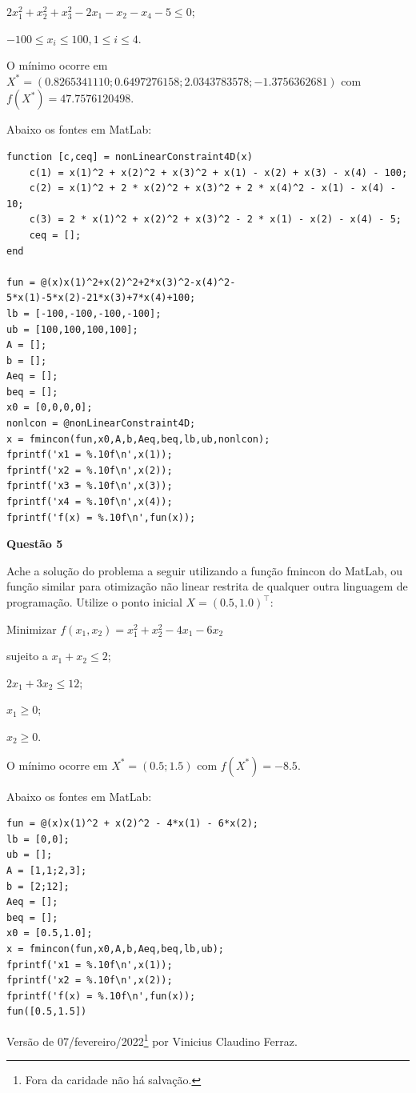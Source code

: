 \documentclass{rbfin}
\begin{document}
$2x_1^2 + x_2^2 + x_3^2 - 2x_1 - x_2 - x_4 - 5 \le 0$;

$-100 \le x_i \le 100, 1 \le i \le 4$.

O mínimo ocorre em $X^* = (0.8265341110; 0.6497276158; 2.0343783578; -1.3756362681)$ com $f(X^*) = 47.7576120498$.

Abaixo os fontes em MatLab:

\singlespacing

\begin{verbatim}
function [c,ceq] = nonLinearConstraint4D(x)
    c(1) = x(1)^2 + x(2)^2 + x(3)^2 + x(1) - x(2) + x(3) - x(4) - 100;
    c(2) = x(1)^2 + 2 * x(2)^2 + x(3)^2 + 2 * x(4)^2 - x(1) - x(4) - 10;
    c(3) = 2 * x(1)^2 + x(2)^2 + x(3)^2 - 2 * x(1) - x(2) - x(4) - 5;
    ceq = [];
end

fun = @(x)x(1)^2+x(2)^2+2*x(3)^2-x(4)^2-5*x(1)-5*x(2)-21*x(3)+7*x(4)+100;
lb = [-100,-100,-100,-100];
ub = [100,100,100,100];
A = [];
b = [];
Aeq = [];
beq = [];
x0 = [0,0,0,0];
nonlcon = @nonLinearConstraint4D;
x = fmincon(fun,x0,A,b,Aeq,beq,lb,ub,nonlcon);
fprintf('x1 = %.10f\n',x(1));
fprintf('x2 = %.10f\n',x(2));
fprintf('x3 = %.10f\n',x(3));
fprintf('x4 = %.10f\n',x(4));
fprintf('f(x) = %.10f\n',fun(x));
\end{verbatim}

\vspace{6mm}

\large

\textbf{Questão 5}

\normalsize

\vspace{6mm}

\doublespacing

Ache a solução do problema a seguir utilizando a função fmincon do MatLab, ou
função similar para otimização não linear restrita de qualquer outra linguagem de
programação. Utilize o ponto inicial $X = (0.5, 1.0)^\top$:

Minimizar $f(x_1, x_2) = x_1^2 + x_2^2 - 4x_1 - 6x_2$

sujeito a $x_1 + x_2 \le 2$;

$2x_1 + 3x_2 \le 12$;

$x_1 \ge 0$;

$x_2 \ge 0$.

O mínimo ocorre em $X^* = (0.5; 1.5)$ com $f(X^*) = -8.5$.

Abaixo os fontes em MatLab:

\singlespacing

\begin{verbatim}
fun = @(x)x(1)^2 + x(2)^2 - 4*x(1) - 6*x(2);
lb = [0,0];
ub = [];
A = [1,1;2,3];
b = [2;12];
Aeq = [];
beq = [];
x0 = [0.5,1.0];
x = fmincon(fun,x0,A,b,Aeq,beq,lb,ub);
fprintf('x1 = %.10f\n',x(1));
fprintf('x2 = %.10f\n',x(2));
fprintf('f(x) = %.10f\n',fun(x));
fun([0.5,1.5])
\end{verbatim}

\vspace{6mm}

Versão de 07/fevereiro/2022\footnote{Fora da caridade não há salvação.} por Vinicius Claudino Ferraz.
\end{document}
